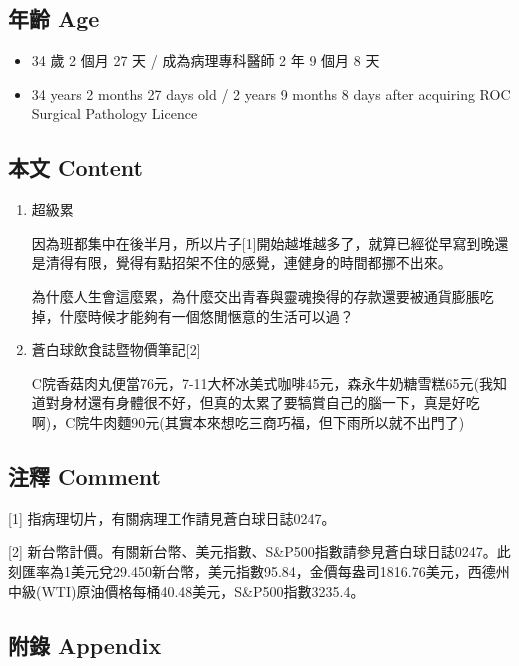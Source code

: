 \documentclass[a5paper, 11pt
]{book}
\providecommand{\tightlist}{%
  \setlength{\itemsep}{0pt}\setlength{\parskip}{0pt}}
\begin{document}
\hypertarget{ux5e74ux9f61-age-44}{%
\subsection{年齡 Age}\label{ux5e74ux9f61-age-44}}

\begin{itemize}
\tightlist
\item
  34 歲 2 個月 27 天 / 成為病理專科醫師 2 年 9 個月 8 天
\item
  34 years 2 months 27 days old / 2 years 9 months 8 days after
  acquiring ROC Surgical Pathology Licence
\end{itemize}

\hypertarget{ux672cux6587-content-44}{%
\subsection{本文 Content}\label{ux672cux6587-content-44}}

\begin{enumerate}
\def\labelenumi{\arabic{enumi}.}
\item
  超級累

  因為班都集中在後半月，所以片子{[}1{]}開始越堆越多了，就算已經從早寫到晚還是清得有限，覺得有點招架不住的感覺，連健身的時間都挪不出來。

  為什麼人生會這麼累，為什麼交出青春與靈魂換得的存款還要被通貨膨脹吃掉，什麼時候才能夠有一個悠閒愜意的生活可以過？
\item
  蒼白球飲食誌暨物價筆記{[}2{]}

  C院香菇肉丸便當76元，7-11大杯冰美式咖啡45元，森永牛奶糖雪糕65元(我知道對身材還有身體很不好，但真的太累了要犒賞自己的腦一下，真是好吃啊)，C院牛肉麵90元(其實本來想吃三商巧福，但下雨所以就不出門了)
\end{enumerate}

\hypertarget{ux6ce8ux91cb-comment-44}{%
\subsection{注釋 Comment}\label{ux6ce8ux91cb-comment-44}}

{[}1{]} 指病理切片，有關病理工作請見蒼白球日誌0247。

{[}2{]}
新台幣計價。有關新台幣、美元指數、S\&P500指數請參見蒼白球日誌0247。此刻匯率為1美元兌29.450新台幣，美元指數95.84，金價每盎司1816.76美元，西德州中級(WTI)原油價格每桶40.48美元，S\&P500指數3235.4。

\hypertarget{ux9644ux9304-appendix-44}{%
\subsection{附錄 Appendix}\label{ux9644ux9304-appendix-44}}
\end{document}
